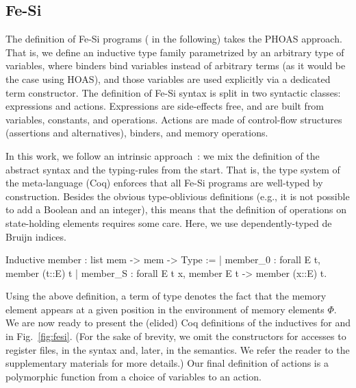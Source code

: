 \documentclass{llncs}
\begin{document}
\subsection{Fe-Si}
The definition of Fe-Si programs ( in the following)
takes the PHOAS approach. 
%
That is, we define an inductive type family parametrized by an
arbitrary type  of variables, where binders bind variables
instead of arbitrary terms (as it would be the case using HOAS), and
those variables are used explicitly via a dedicated term constructor.
%
The definition of Fe-Si syntax is split in two syntactic classes:
expressions and actions. 
%
Expressions are side-effects free, and are built from variables,
constants, and operations.
%
Actions are made of control-flow structures (assertions and
alternatives), binders, and memory operations. 

In this work, we follow an intrinsic
approach~\cite{DBLP:journals/jar/BentonHKM12}: we mix the definition
of the abstract syntax and the typing-rules from the start. That is,
the type system of the meta-language (Coq) enforces that all Fe-Si
programs are well-typed by construction.
%
Besides the obvious type-oblivious definitions (e.g., it is not
possible to add a Boolean and an integer), this means that the
definition of operations on state-holding elements requires some care.
%
Here, we use dependently-typed de Bruijn indices. 
\begin{coq}
Inductive member : list mem -> mem ->  Type :=
| member_0 : forall E t, member (t::E) t
| member_S : forall E t x, member E t -> member (x::E) t.
\end{coq}
Using the above definition, a term of type  denotes
the fact that the memory element  appears at a given position
in the environment of memory elements $\Phi$. 
%
We are now ready to present the (elided) Coq definitions of the
inductives for  and  in Fig.~\ref{fig:fesi}.
%
(For the sake of brevity, we omit the constructors for accesses to
register files, in the syntax and, later, in the semantics. We refer
the reader to the supplementary materials for more details.)
%
Our final definition  of actions is a polymorphic
function from a choice of variables to an action.
\end{document}
